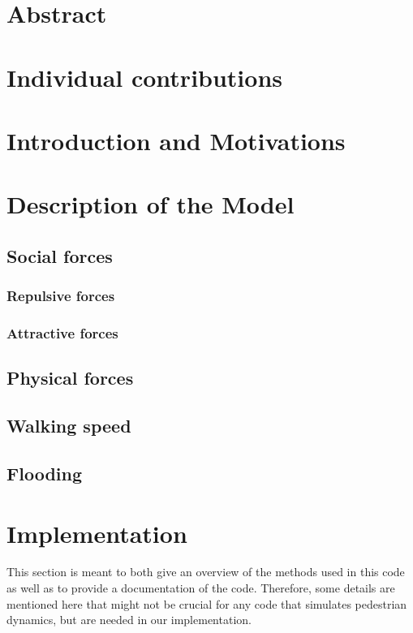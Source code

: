\documentclass[11pt]{article}
\begin{document}
\newpage




\section{Abstract}

\section{Individual contributions}

\section{Introduction and Motivations}

\section{Description of the Model}

\subsection{Social forces}
\subsubsection{Repulsive forces}
\subsubsection{Attractive forces}
\subsection{Physical forces}
\subsection{Walking speed}
\subsection{Flooding}

\section{Implementation}
This section is meant to both give an overview of the methods used in this code as well as to provide a documentation of the code. Therefore, some details are mentioned here that might not be crucial for any code that simulates pedestrian dynamics, but are needed in our implementation. 
\end{document}
